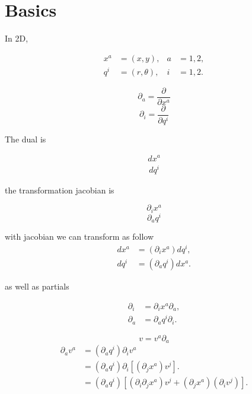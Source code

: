 



\section{Basics}
In 2D,

\[
    \boxed{
        \begin{aligned}
            x^a & =(x,y),      & a & =1,2, \\
            q^i & =(r,\theta), & i & =1,2.
        \end{aligned}
    }
\]

\[
    \boxed{\partial_a=\frac{\partial}{\partial x^a}}
\]
\[
    \boxed{\partial_i=\frac{\partial}{\partial q^i}}
\]

The dual is

\[
    \boxed{
        \begin{aligned}
            dx^a
        \end{aligned}
    }
\]
\[
    \boxed{
        \begin{aligned}
            dq^i
        \end{aligned}
    }
\]

the transformation jacobian is

\[
    \partial_i x^a
\]
\[
    \partial_a q^i
\]

with jacobian we can transform as follow
\[
    \boxed{
        \begin{aligned}
            dx^a & =(\partial_i x^a)dq^i, \\
            dq^i & =(\partial_a q^i)dx^a.
        \end{aligned}
    }
\]

as well as partials

\[
    \boxed{
        \begin{aligned}
            \partial_i & =\partial_i x^a\partial_a, \\
            \partial_a & =\partial_a q^i\partial_i.
        \end{aligned}
    }
\]


\[
    v=v^a\partial_a
\]
\[
    \begin{aligned}
        \partial_a v^a
         & =(\partial_aq^i)\partial_i v^a                                                 \\
         & =(\partial_aq^i)\partial_i[(\partial_jx^a)v^j].                                \\
         & =(\partial_aq^i)[(\partial_i\partial_jx^a)v^j+(\partial_jx^a)(\partial_iv^j)]. \\
    \end{aligned}
\]



